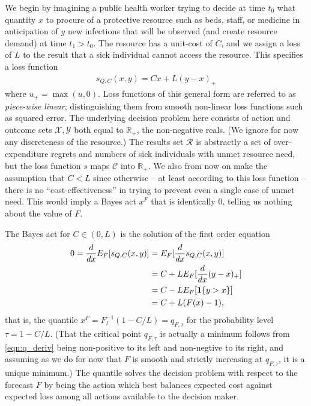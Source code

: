 \documentclass{article}
\begin{document}
We begin by imagining a public health worker trying to decide at time $t_0$ what quantity $x$ to procure of a protective resource such as beds, staff, or medicine in anticipation of $y$ new infections that will be observed (and create resource demand) at time $t_1>t_0$. The resource has a unit-cost of $C$, and we assign a loss of $L$ to the result that a sick individual cannot access the resource. This specifies a loss function  
\begin{align}
s_{Q,C}(x,y) = Cx + L(y-x)_+ \label{eqn:quantile_loss}
\end{align}
where $u_+ = \max(u,0)$.  Loss functions of this general form are referred to as \emph{piece-wise linear}, distinguishing them from smooth non-linear loss functions such as squared error.
The underlying decision problem here consists of action and outcome sets $\mathcal{X},\mathcal{Y}$ both equal to $\mathbb{R}_+$, the non-negative reals.  (We ignore for now any discreteness of the resource.) The results set $\mathcal{R}$ is abstractly a set of over-expenditure regrets and numbers of sick individuals with unmet resource need, but the loss function $s$ maps $\mathcal{C}$ into $\mathbb{R}_+$. We also from now on make the assumption that $C < L$ since otherwise -- at least according to this loss function -- there is no ``cost-effectiveness'' in trying to prevent even a single case of unmet need. This would imply a Bayes act $x^F$ that is identically 0, telling us nothing about the value of $F$.

The Bayes act for $C \in (0,L)$ is the solution of the first order equation 
\begin{align}
0 = \frac{d {} }{d {x}} E_F[s_{Q,C}(x,y)] &= E_{F}[\frac{d {} }{d {x}}s_{Q,C}(x,y)] \\
&= C + LE_{F}[\frac{d {} }{d {x}}(y-x)_+] \\
&= C - LE_{F}[\mathbf{1}\{y > x\}] \\
&= C + L(F(x) - 1), \label{eqn:q_deriv}
\end{align}
that is, the quantile $x^F = F_l^{-1}(1 - C/L) = q_{F,\tau}$ for the probability level $\tau = 1-C/L$. (That the critical point $q_{F,\tau}$ is actually a minimum follows from \eqref{eqn:q_deriv} being non-positive to its left and non-negtive to its right, and assuming as we do for now that $F$ is smooth and strictly increasing at $q_{F,\tau}$, it is a unique minimum.) The quantile solves the decision problem with respect to the forecast $F$ by being the action which best balances expected cost against expected loss among all actions available to the decision maker.
\end{document}
